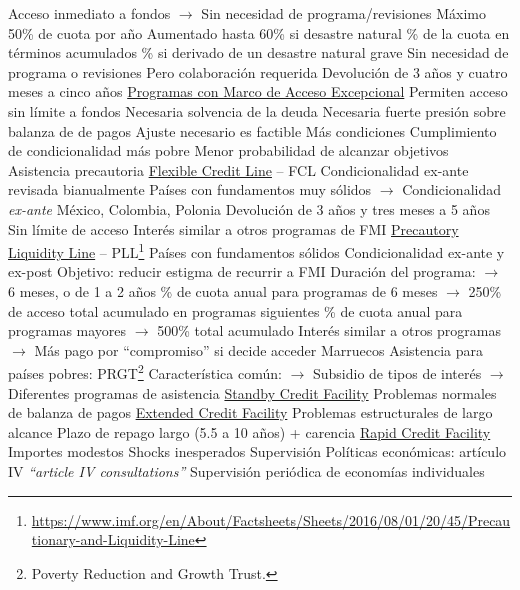 \documentclass{nuevotema}
\begin{document}
\begin{esquemal}
				\4[] Acceso inmediato a fondos
				\4[] $\to$ Sin necesidad de programa/revisiones
				\4[] Máximo 50\% de cuota por año
				\4[] Aumentado hasta 60\% si desastre natural
				\% de la cuota en términos acumulados
				\% si derivado de un desastre natural grave
				\4[] Sin necesidad de programa o revisiones
				\4[] Pero colaboración requerida
				\4[] Devolución de 3 años y cuatro meses a cinco años
				\4 \underline{Programas con Marco de Acceso Excepcional}
				\4[] Permiten acceso sin límite a fondos
				\4[] Necesaria solvencia de la deuda
				\4[] Necesaria fuerte presión sobre balanza de de pagos
				\4[] Ajuste necesario es factible
				\4[] Más condiciones
				\4[] Cumplimiento de condicionalidad más pobre
				\4[] Menor probabilidad de alcanzar objetivos
			\3 Asistencia precautoria
				\4 \underline{Flexible Credit Line} -- FCL
				\4[] Condicionalidad ex-ante revisada bianualmente
				\4[] Países con fundamentos muy sólidos
				\4[] $\to$ Condicionalidad \textit{ex-ante}
				\4[] México, Colombia, Polonia
				\4[] Devolución de 3 años y tres meses a 5 años
				\4[] Sin límite de acceso
				\4[] Interés similar a otros programas de FMI
				\4 \underline{Precautory Liquidity Line} -- PLL\footnote{\url{https://www.imf.org/en/About/Factsheets/Sheets/2016/08/01/20/45/Precautionary-and-Liquidity-Line}}
				\4[] Países con fundamentos sólidos
				\4[] Condicionalidad ex-ante y ex-post
				\4[] Objetivo: reducir estigma de recurrir a FMI
				\4[] Duración del programa:
				\4[] $\to$ 6 meses, o de 1 a 2 años
				\% de cuota anual para programas de 6 meses
				\4[] $\to$ 250\% de acceso total acumulado en programas siguientes
				\% de cuota anual para programas mayores
				\4[] $\to$ 500\% total acumulado
				\4[] Interés similar  a otros programas
				\4[] $\to$ Más pago por ``compromiso'' si decide acceder
				\4[] Marruecos
			\3 Asistencia para países pobres: PRGT\footnote{Poverty Reduction and Growth Trust.}
				\4 Característica común:
				\4[] $\to$ Subsidio de tipos de interés
				\4[] $\to$ Diferentes programas de asistencia
				\4 \underline{Standby Credit Facility}
				\4[] Problemas normales de balanza de pagos
				\4 \underline{Extended Credit Facility}
				\4[] Problemas estructurales de largo alcance
				\4[] Plazo de repago largo (5.5 a 10 años)
				\4[] + carencia
				\4 \underline{Rapid Credit Facility}
				\4[] Importes modestos
				\4[] Shocks inesperados
		\2 Supervisión
			\3 Políticas económicas: artículo IV
				\4 \textit{``article IV consultations''}
				\4 Supervisión periódica de economías individuales

\end{esquemal}
\end{document}
